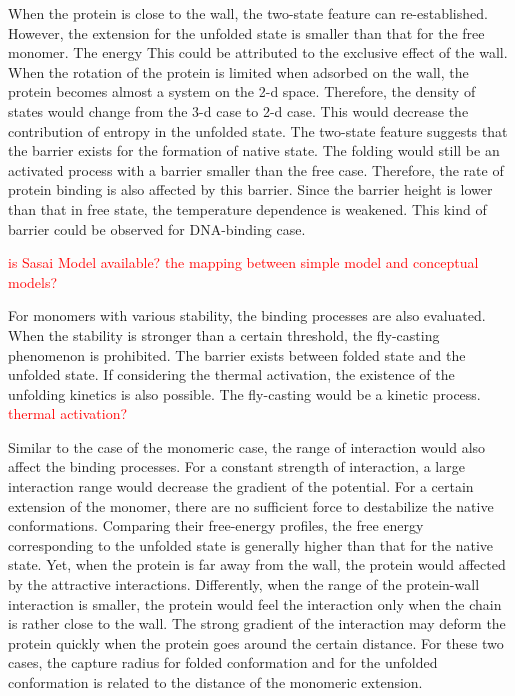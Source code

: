 \documentclass[preprint,preprintnumbers,amsmath,amssymb,showpacs,aps,pre]{revtex4-1}
\begin{document}
When the protein is close to the
wall, the two-state feature can re-established. However, the extension for the
unfolded state is smaller than that for the free monomer. The energy This could
be attributed to the exclusive effect of the wall. When the rotation of the
protein is limited when adsorbed on the wall, the protein becomes almost a
system on the 2-d space. Therefore, the density of states would change from
the 3-d case to 2-d case. This would decrease the contribution of entropy in
the unfolded state. The two-state feature suggests that the barrier exists for
the formation of native state. The folding would still be an activated
process with a barrier smaller than the free case. Therefore, the rate of
protein binding is also affected by this barrier. Since the barrier height is
lower than that in free state, the temperature dependence is weakened. This
kind of barrier could be observed for DNA-binding case.

\textcolor{red}{is Sasai Model available?}
\textcolor{red}{the mapping between simple model and conceptual models?}

For monomers with various stability, the binding processes are also evaluated.
When the stability is stronger than a certain threshold, the fly-casting
phenomenon is prohibited. The barrier exists between folded state and the
unfolded state. If considering the thermal activation, the existence of the
unfolding kinetics is also possible. The fly-casting would be a kinetic
process. \textcolor{red}{thermal activation?}  

Similar to the case of the monomeric case, the range of interaction would also
affect the binding processes. For a constant strength of interaction, a large
interaction range would decrease the gradient of the potential. For a certain
extension of the monomer, there are no sufficient force to destabilize the
native conformations. Comparing their free-energy profiles, the free energy
corresponding to the unfolded state is generally higher than that for the
native state. Yet, when the protein is far away from the wall, the protein
would affected by the attractive interactions. Differently, when the range of
the protein-wall interaction is smaller, the protein would feel the
interaction only when the chain is rather close to the wall. The strong
gradient of the interaction may deform the protein quickly when the protein
goes around the certain distance. For these two cases, the capture radius for
folded conformation and for the unfolded conformation is related to the
distance of the monomeric extension.
\end{document}
